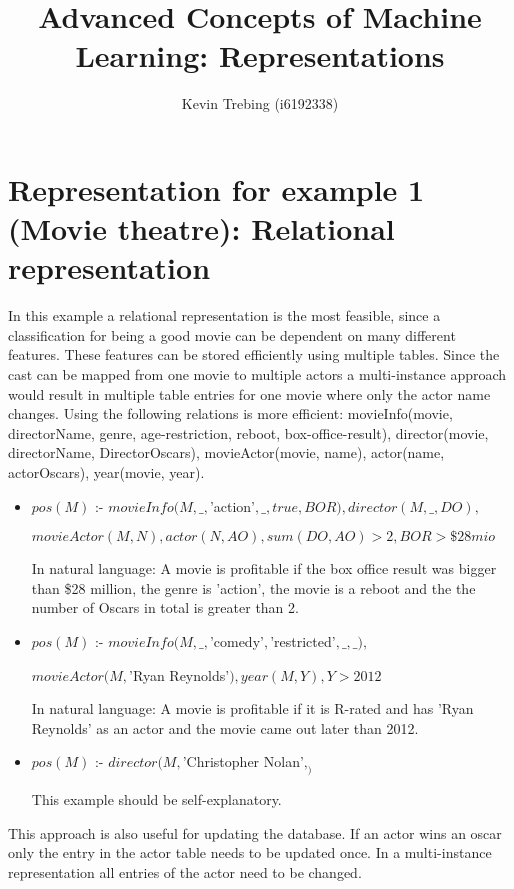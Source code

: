 \documentclass[a4paper]{article}
\title{Advanced Concepts of Machine Learning: Representations}
\author{Kevin Trebing (i6192338)}
\begin{document}
\maketitle

\section{Representation for example 1 (Movie theatre): Relational representation}
In this example a relational representation is the most feasible, since a classification for being a good movie can be dependent on many different features. These features can be stored efficiently using multiple tables. Since the cast can be mapped from one movie to multiple actors a multi-instance approach would result in multiple table entries for one movie where only the actor name changes. Using the following relations is more efficient:
movieInfo(movie, directorName, genre, age-restriction, reboot, box-office-result), director(movie, directorName, DirectorOscars), movieActor(movie, name), actor(name, actorOscars), year(movie, year).

\begin{itemize}
\item $pos(M)$ :- $movieInfo(M, \_, $'action'$, \_, true, BOR), director(M, \_, DO), $

\indent\indent\indent\indent$movieActor(M, N), actor(N, AO), sum(DO, AO) > 2, BOR > \$28 mio$

In natural language: A movie is profitable if the box office result was bigger than \$28 million, the genre is 'action', the movie is a reboot and the the number of Oscars in total is greater than 2.

\item $pos(M)$ :- $movieInfo(M, \_, $'comedy'$, $'restricted'$, \_, \_), $

 
\indent\indent\indent\indent$ movieActor(M, $'Ryan Reynolds'$), year(M, Y), Y > 2012$

In natural language: A movie is profitable if it is R-rated and has 'Ryan Reynolds' as an actor and the movie came out later than 2012.

\item $pos(M)$ :- $director(M, $'Christopher Nolan'$, _)$

This example should be self-explanatory.
\end{itemize}

This approach is also useful for updating the database. If an actor wins an oscar only the entry in the actor table needs to be updated once. In a multi-instance representation all entries of the actor need to be changed.
\end{document}
